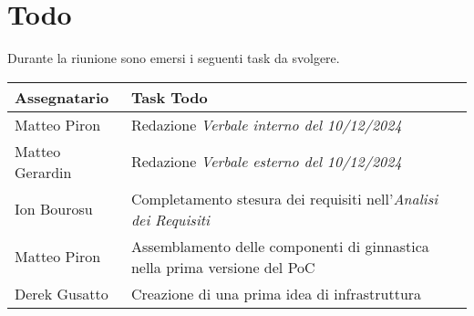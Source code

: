 \section{Todo}
Durante la riunione sono emersi i seguenti task da svolgere.

\begin{center}
  \begin{tabular}{|L{5cm}|L{8cm}|}
    \hline
    \textbf{Assegnatario} & \textbf{Task Todo} \\ \hline
    Matteo Piron & Redazione \textit{Verbale interno del 10/12/2024}  \\ \hline
    Matteo Gerardin & Redazione \textit{Verbale esterno del 10/12/2024}  \\ \hline
    Ion Bourosu & Completamento stesura dei requisiti nell'\textit{Analisi dei Requisiti}  \\ \hline
    Matteo Piron & Assemblamento delle componenti di ginnastica nella prima versione del PoC  \\ \hline
    Derek Gusatto & Creazione di una prima idea di infrastruttura \\ \hline
  \end{tabular}
\end{center}